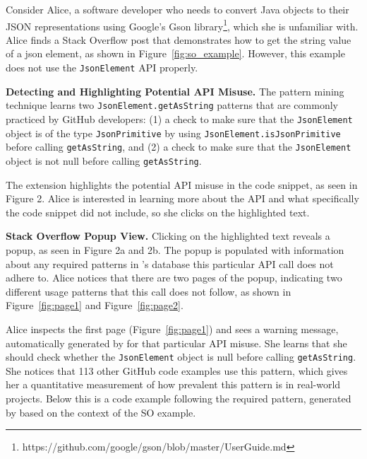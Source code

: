 
Consider Alice, a software developer who needs to convert Java objects to their JSON representations using Google's Gson library\footnote{https://github.com/google/gson/blob/master/UserGuide.md}, which she is unfamiliar with. Alice finds a Stack Overflow post that demonstrates how to get the string value of a json element, as shown in Figure~\ref{fig:so_example}. However, this example does not use the {\tt JsonElement} API properly. 

{\bf Detecting and Highlighting Potential API Misuse.}
The pattern mining technique learns two {\tt JsonElement.getAs\-String} patterns that are commonly practiced by GitHub developers: (1) a check to make sure that the {\tt JsonElement} object is of the type {\tt JsonPrimitive} by using {\tt JsonElement.isJsonPrimitive} before calling {\tt getAsString}, and (2) a check to make sure that the {\tt JsonElement} object is not null before calling {\tt getAsString}.

The extension highlights the potential API misuse in the code snippet, as seen in Figure 2. Alice is interested in learning more about the API and what specifically the code snippet did not include, so she clicks on the highlighted text.

{\bf Stack Overflow Popup View.}
Clicking on the highlighted text reveals a popup, as seen in Figure 2a and 2b. The popup is populated with information about any required patterns in {\soa}'s database this particular API call does not adhere to. Alice notices that there are two pages of the popup, indicating two different usage patterns that this call does not follow, as shown in Figure~\ref{fig:page1} and Figure~\ref{fig:page2}. 

Alice inspects the first page (Figure~\ref{fig:page1}) and sees a warning message, automatically generated by {\soa} for that particular API misuse. She learns that she should check whether the {\tt JsonElement} object is null before calling {\tt getAsString}. She notices that 113 other GitHub code examples use this pattern, which gives her a quantitative measurement of how prevalent this pattern is in real-world projects. Below this is a code example following the required pattern, generated by {\soa} based on the context of the SO example.

